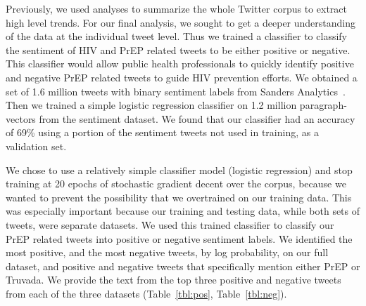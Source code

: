 \documentclass[conference]{IEEEtran}
\begin{document}
Previously, we used analyses to summarize the whole Twitter corpus to extract high level trends. For our final analysis, we sought to get a deeper understanding of the data at the individual tweet level. Thus we trained a classifier to classify the sentiment of HIV and PrEP related tweets to be either positive or negative. This classifier would allow public health professionals to quickly identify positive and negative PrEP related tweets to guide HIV prevention efforts. We obtained a set of 1.6 million tweets with binary sentiment labels from Sanders Analytics~\cite{sentimentdata}. Then we trained a simple logistic regression classifier on 1.2 million paragraph-vectors from the sentiment dataset. We found that our classifier had an accuracy of 69\% using a portion of the sentiment tweets not used in training, as a validation set.

We chose to use a relatively simple classifier model (logistic regression) and stop training at 20 epochs of stochastic gradient decent over the corpus, because we wanted to prevent the possibility that we overtrained on our training data. This was especially important because our training and testing data, while both sets of tweets, were separate datasets. We used this trained classifier to classify our PrEP related tweets into positive or negative sentiment labels. We identified the most positive, and the most negative tweets, by log probability, on our full dataset, and positive and negative tweets that specifically mention either PrEP or Truvada. We provide the text from the top three positive and negative tweets from each of the three datasets (Table~\ref{tbl:pos}, Table~\ref{tbl:neg}).
\end{document}
